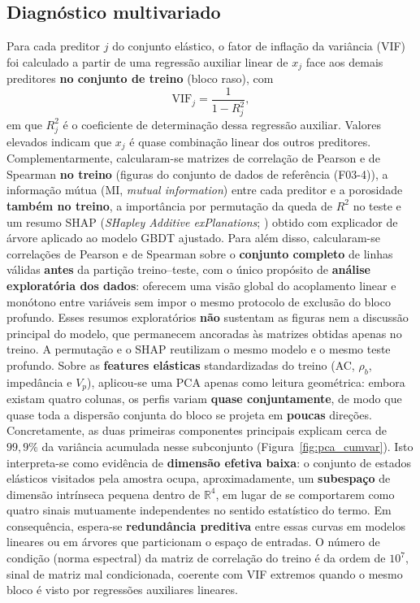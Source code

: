 \documentclass[12pt,a4paper]{article}
\newcommand{\dadosref}{conjunto de dados de referência (F03-4)}
\begin{document}
\subsection{Diagnóstico multivariado}\label{subsec:featstudy}
Para cada preditor \(j\) do conjunto elástico, o fator de inflação da
variância (VIF) foi calculado a partir de uma regressão auxiliar linear de \(x_j\)
face aos demais preditores \textbf{no conjunto de treino} (bloco raso), com
\begin{equation}\label{eq:vif}
\mathrm{VIF}_j = \frac{1}{1-R_j^2},
\end{equation}
em que \(R_j^2\) é o coeficiente de determinação dessa regressão auxiliar.
Valores elevados indicam que \(x_j\) é quase combinação linear dos
outros preditores. Complementarmente, calcularam-se matrizes de correlação de
Pearson e de Spearman \textbf{no treino} (figuras do \dadosref), a informação mútua (MI, \textit{mutual information})
entre cada preditor e a porosidade \textbf{também no treino}, a importância por permutação da queda de
\(R^2\) no teste e um resumo SHAP (\textit{SHapley Additive exPlanations}; \citealt{lundberg2017unified}) obtido com
explicador de árvore aplicado ao modelo GBDT ajustado. Para além disso, calcularam-se
correlações de Pearson e de Spearman sobre o \textbf{conjunto completo} de linhas válidas
\textbf{antes} da partição treino--teste, com o único propósito de \textbf{análise exploratória
dos dados}: oferecem uma visão global do acoplamento linear e monótono entre variáveis
sem impor o mesmo protocolo de exclusão do bloco profundo. Esses resumos exploratórios
\textbf{não} sustentam as figuras nem a discussão principal do modelo, que permanecem
ancoradas às matrizes obtidas apenas no treino. A permutação e o SHAP reutilizam o mesmo modelo
e o mesmo teste profundo. Sobre as \textbf{features elásticas} standardizadas do treino
(AC, \(\rho_b\), impedância e \(V_p\)), aplicou-se uma PCA apenas como leitura
geométrica: embora existam quatro colunas, os perfis variam \textbf{quase conjuntamente},
de modo que quase toda a dispersão conjunta do bloco se projeta em \textbf{poucas}
direções. Concretamente, as duas primeiras componentes principais explicam cerca de
\(99{,}9\%\) da variância acumulada nesse subconjunto (Figura~\ref{fig:pca_cumvar}). Isto interpreta-se como evidência
de \textbf{dimensão efetiva baixa}: o conjunto de estados elásticos visitados pela amostra
ocupa, aproximadamente, um \textbf{subespaço} de dimensão intrínseca pequena dentro de
\(\mathbb{R}^4\), em lugar de se comportarem como quatro sinais mutuamente
independentes no sentido estatístico do termo. Em consequência, espera-se
\textbf{redundância preditiva} entre essas curvas em modelos lineares ou em árvores
que particionam o espaço de entradas. O número de condição
(norma espectral) da matriz de correlação do treino é da ordem de \(10^7\), sinal de
matriz mal condicionada, coerente com VIF extremos quando o mesmo bloco é visto por
regressões auxiliares lineares.
\end{document}

